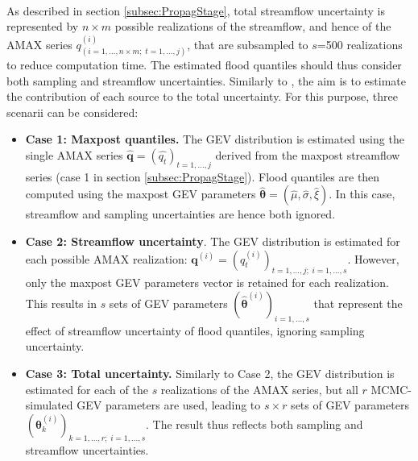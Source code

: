 \documentclass[11pt]{article}
\begin{document}
    \paragraph{}
    As described in section \ref{subsec:PropagStage}, total streamflow uncertainty is represented by $n \times m$ possible realizations of the streamflow, and hence of the AMAX series $q^{(i)}_{(i=1,...,n \times m;\;t=1,...,j)}$, that are subsampled to $s$=500 realizations to reduce computation time. The estimated flood quantiles should thus consider both sampling and streamflow uncertainties. Similarly to \citet{steinbakk_propagation_2016}, the aim is to estimate the contribution of each source to the total uncertainty. For this purpose, three scenarii can be considered:
    
    \begin{itemize}
        \item \textbf{Case 1: Maxpost quantiles.}        
        The GEV distribution is estimated using the  single AMAX series $\mathbf{\hat{q}} = (\hat{q_t})_{t=1,...,j}$ derived from the maxpost streamflow series (case 1 in section \ref{subsec:PropagStage}). Flood quantiles are then computed using the maxpost GEV parameters $\boldsymbol{\hat{\theta}} =  (\hat{\mu}, \hat{\sigma}, \hat{\xi})$. In this case, streamflow and sampling uncertainties are hence both ignored.
        
        \item \textbf{Case 2: Streamflow uncertainty}. The GEV distribution is estimated for each possible AMAX realization: $\mathbf{q}^{(i)} = (q_t^{(i)})_{t=1,...,j;\;i=1,...,s}$. However, only the maxpost GEV parameters vector is retained for each realization. This results in $s$ sets of GEV parameters $(\boldsymbol{\hat{\theta}}^{(i)})_{i=1,...,s}$ that represent the effect of streamflow uncertainty of flood quantiles, ignoring sampling uncertainty.
    
        \item \textbf{Case 3: Total uncertainty.} Similarly to Case 2, the GEV distribution is estimated for each of the $s$ realizations of the AMAX series, but all $r$ MCMC-simulated GEV parameters are used, leading to $s \times r$ sets of GEV parameters $(\boldsymbol{\theta}^{(i)}_k)_{k=1,...,r;\;i=1,...,s}$. The result thus reflects both sampling and streamflow uncertainties.
    \end{itemize}
    
\end{document}
